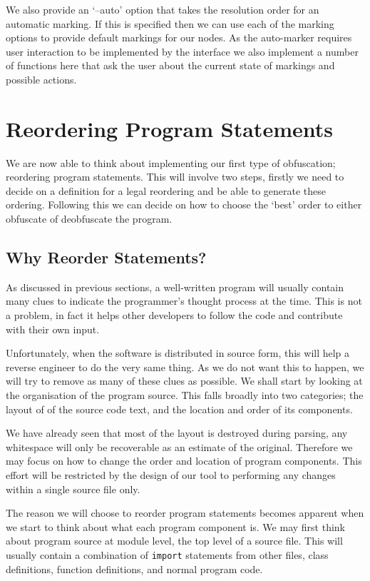 \documentclass[twoside,a4paper]{report}
\begin{document}
We also provide an `--auto' option that takes the resolution order for an automatic marking. If this is specified then we can use each of the
marking options to provide default markings for our nodes. As the auto-marker requires user interaction to be implemented by the interface
we also implement a number of functions here that ask the user about the current state of markings and possible actions.

\section{Reordering Program Statements}

We are now able to think about implementing our first type of obfuscation; reordering program statements. This will involve two steps,
firstly we need to decide on a definition for a legal reordering and be able to generate these ordering. Following this we can decide on how to
choose the `best' order to either obfuscate of deobfuscate the program.

\subsection{Why Reorder Statements?}

As discussed in previous sections, a well-written program will usually contain many clues to indicate the programmer's thought process
at the time. This is not a problem, in fact it helps other developers to follow the code and contribute with their own input. 

Unfortunately, when the software is distributed in source form, this will help a reverse engineer to do the very same thing. As we do not want
this to happen, we will try to remove as many of these clues as possible. We shall start by looking at the organisation of the program source.
This falls broadly into two categories; the layout of of the source code text, and the location and order of its components. 

We have already seen that most of the layout is destroyed during parsing, any whitespace will only be recoverable as an estimate of the original.
Therefore we may focus on how to change the order and location of program components. This effort will be restricted by the design of our tool to performing any
changes within a single source file only.

The reason we will choose to reorder program statements becomes apparent when we start to think about what each program component is. We may first think about
program source at module level, the top level of a source file. This will usually contain a combination of \texttt{import} statements from
other files, class definitions, function definitions, and normal program code.
\end{document}
